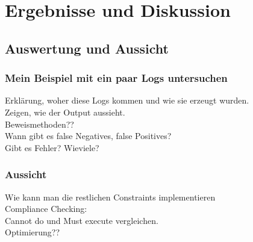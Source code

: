 
\chapter{Ergebnisse und Diskussion} %

\label{Chapter5} %


\section{Auswertung und Aussicht}
\subsection{Mein Beispiel mit ein paar Logs untersuchen}
Erklärung, woher diese Logs kommen und wie sie erzeugt wurden.\\
Zeigen, wie der Output aussieht.\\
Beweismethoden??\\
Wann gibt es false Negatives, false Positives?\\
Gibt es Fehler? Wieviele? 

\subsection{Aussicht}
Wie kann man die restlichen Constraints implementieren\\
Compliance Checking:\\
Cannot do und Must execute vergleichen.\\
Optimierung??\\



